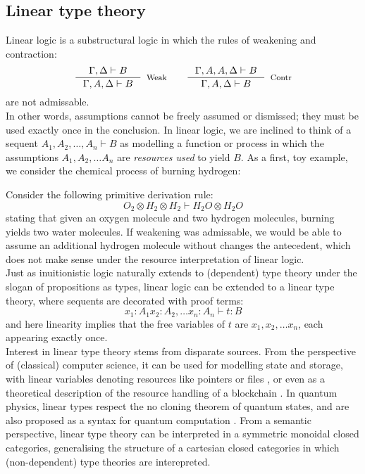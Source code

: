 \subsection{Linear type theory}
Linear logic is a substructural logic in which the rules of weakening and contraction:
\[
  \begin{split}
    \inference{\Gamma, \Delta \vdash B}{\Gamma, A, \Delta \vdash B}[Weak] \quad \quad 
    \inference{\Gamma, A, A, \Delta \vdash B}{\Gamma, A, \Delta \vdash B}[Contr]
    \end{split}
\]
are not admissable.\\
In other words, assumptions cannot be freely assumed or dismissed; they must be used exactly once in the conclusion. In linear logic, we are inclined to think of a sequent $A_1, A_2, \dots, A_n \vdash B$ as modelling a function or process in which the assumptions $A_1, A_2, \dots A_n$ are \textit{resources used} to yield $B$. As a first, toy example, we consider the chemical process of burning hydrogen:
\begin{ex}\label{burn}
Consider the following primitive derivation rule: 
\[
  O_2 \otimes H_2 \otimes H_2 \vdash H_2O \otimes H_2O
\]
stating that given an oxygen molecule and two hydrogen molecules, burning yields two water molecules. If weakening was admissable, we would be able to assume an additional hydrogen molecule without changes the antecedent, which does not make sense under the resource interpretation of linear logic.\\
Just as inuitionistic logic naturally extends to (dependent) type theory under the slogan of propositions as types, linear logic can be extended to a linear type theory, where sequents are decorated with proof terms:
\[
  x_1 : A_1 x_2 : A_2, \dots x_n : A_n \vdash t : B
\]
and here linearity implies that the free variables of $t$ are $x_1, x_2, \dots x_n$, each appearing exactly once.\\
Interest in linear type theory stems from disparate sources. From the perspective of (classical) computer science, it can be used for modelling state and storage, with linear variables denoting resources like pointers or files \cite{krishnaswami}, or even as a theoretical description of the resource handling of a blockchain \cite{meredith2015linear}. In quantum physics, linear types respect the no cloning theorem of quantum states, and are also proposed as a syntax for quantum computation \cite{duncan2006types}. From a semantic perspective, linear type theory can be interpreted in a symmetric monoidal closed categories, generalising the structure of a cartesian closed categories in which (non-dependent) type theories are interepreted.\\
\end{ex}

